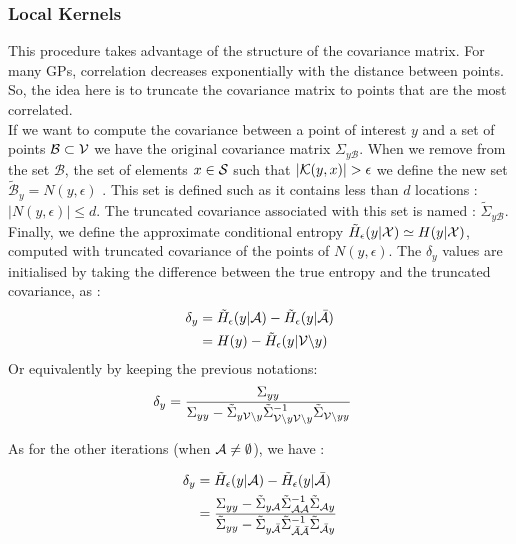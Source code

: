\documentclass[12pt,twoside]{report}
\begin{document}
\subsubsection{Local Kernels} This procedure takes advantage of the structure of the covariance matrix. For many GPs, correlation decreases exponentially with the distance between points. So, the idea here is to truncate the covariance matrix to points that are the most correlated. \\ 

If we want to compute the covariance between a point of interest $y$ and a set of points $\mathcal{B} \subset \V $ we have the original covariance matrix $\Sigma_{y\mathcal{B}}$. When we remove from the set $\mathcal{B}$, the set of elements  $x \in \S$ such that $|\K(y,x)| > \epsilon $ we define the new set  $\tilde{\mathcal{B}}_y = N(y,\epsilon)$ . This set is defined such as it contains less than $d$ locations : $|N(y,\epsilon)| \leq d $. The truncated covariance associated with this set is named : $\tilde{\Sigma}_{y\mathcal{B}}$. Finally, we define the approximate conditional entropy $\tilde{H}_\epsilon(y | \X) \simeq H(y | \X)$, computed with truncated covariance of the points of $N(y,\epsilon)$. The $\delta_y$ values are initialised by taking the difference between the true entropy and the truncated covariance, as :
\begin{align}
	\delta_y &= \tilde{H}_\epsilon(y | \A) - \tilde{H}_\epsilon(y | \bar{\A}) \\
			&= H(y) - \tilde{H}_\epsilon(y | \V \backslash y )
\end{align}
Or equivalently by keeping the previous notations: 
\begin{align}
	\delta_y &= \frac{\Sigma_{yy} }{\Sigma_{yy} - \tilde{\Sigma}_{y\V \backslash y} \tilde{\Sigma}_{\V \backslash y \V \backslash y}^{-1} \tilde{\Sigma}_{\V \backslash y y} } \label{equ:initLocal}
\end{align}


As for the other iterations (when $\A \neq \emptyset$), we have : 

\begin{align}
	\delta_y &= \tilde{H}_\epsilon(y | \A) - \tilde{H}_\epsilon(y | \bar{\A}) \\
	&= \frac{\Sigma_{yy} - \tilde{\Sigma}_{y\A} \tilde{\Sigma}_{\A\A}^{-1} \tilde{\Sigma}_{\A y} }{\tilde{\Sigma}_{yy} - \tilde{\Sigma}_{y\bar{\A}} \tilde{\Sigma}_{\bar{\A}\bar{\A}}^{-1} \tilde{\Sigma}_{\bar{\A} y} } \label{equ:updateLocal}
\end{align}
\end{document}
